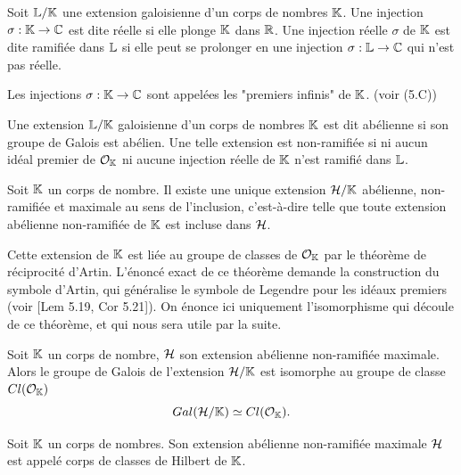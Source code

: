 \begin{Def} Soit $\mathbb{L}/\mathbb{K}$ une extension galoisienne d'un corps de nombres $\mathbb{K}$. Une injection $\sigma :\mathbb{K}\rightarrow\mathbb{C}$ est dite réelle si elle plonge $\mathbb{K}$ dans $\mathbb{R}$. Une injection réelle $\sigma$ de $\mathbb{K}$ est dite ramifiée dans $\mathbb{L}$ si elle peut se prolonger en une injection $\sigma :\mathbb{L}\rightarrow\mathbb{C}$ qui n'est pas réelle. 
\end{Def}

\begin{Rem}
	Les injections $\sigma :\mathbb{K}\rightarrow\mathbb{C}$ sont appelées les "premiers infinis" de $\mathbb{K}$. (voir \cite{Cox}(5.C))
\end{Rem}

\begin{Def}
	Une extension $\mathbb{L}/\mathbb{K}$ galoisienne d'un corps de nombres $\mathbb{K}$ est dit abélienne si son groupe de Galois est abélien. Une telle extension est non-ramifiée si ni aucun idéal premier de $\mathcal{O}_{\mathbb{K}}$ ni aucune injection réelle de $\mathbb{K}$ n'est ramifié dans $\mathbb{L}$.
\end{Def}

\begin{The}
	
	Soit $\mathbb{K}$ un corps de nombre. Il existe une unique extension $\mathcal{H}/\mathbb{K}$ abélienne, non-ramifiée et maximale au sens de l'inclusion, c'est-à-dire telle que toute extension abélienne non-ramifiée de $\mathbb{K}$ est incluse dans $\mathcal{H}$.
\end{The}

Cette extension de $\mathbb{K}$ est liée au groupe de classes de $\mathcal{O}_{\mathbb{K}}$ par le théorème de réciprocité d'Artin. L'énoncé exact de ce théorème demande la construction du symbole d'Artin, qui généralise le symbole de Legendre pour les idéaux premiers (voir \cite{Cox}[Lem 5.19, Cor 5.21]). On énonce ici uniquement l'isomorphisme qui découle de ce théorème, et qui nous sera utile par la suite. 

\begin{The}\label{CHilbert}
	
	Soit $\mathbb{K}$ un corps de nombre, $\mathcal{H}$ son extension abélienne non-ramifiée maximale. Alors le groupe de Galois de l'extension $\mathcal{H}/\mathbb{K}$ est isomorphe au groupe de classe $Cl(\mathcal{O}_{\mathbb{K}})$
	\begin{equation*}
		Gal(\mathcal{H}/\mathbb{K})\simeq Cl(\mathcal{O}_{\mathbb{K}}).
	\end{equation*}
\end{The} 

\begin{Def}
	Soit $\mathbb{K}$ un corps de nombres. Son extension abélienne non-ramifiée maximale $\mathcal{H}$ est appelé corps de classes de Hilbert de $\mathbb{K}$.
\end{Def}



